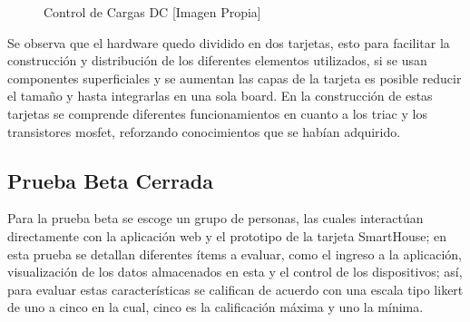 \begin{figure}[!t]
	\centering
	\caption{Control de Cargas DC [Imagen Propia]}
	\label{fig:DCc}
\end{figure}

Se observa que el hardware quedo dividido en dos tarjetas, esto para facilitar la construcción y distribución de los diferentes elementos utilizados, si se usan componentes superficiales y se aumentan las capas de la tarjeta es posible reducir el tamaño y hasta integrarlas en una sola board. En la construcción de estas tarjetas se comprende diferentes funcionamientos en cuanto a los triac y los transistores mosfet, reforzando conocimientos que se habían adquirido.\\

\subsection{Prueba Beta Cerrada} 

Para la prueba beta se escoge un grupo de personas, las cuales interactúan directamente con la aplicación web y el prototipo de la tarjeta SmartHouse; en esta prueba se detallan diferentes ítems a evaluar, como el ingreso a la aplicación, visualización de los datos almacenados en esta y el control de los dispositivos; así, para evaluar estas características se califican de acuerdo con una escala tipo likert \cite{lik} de uno a cinco en la cual, cinco es la calificación máxima y uno la mínima.\\

